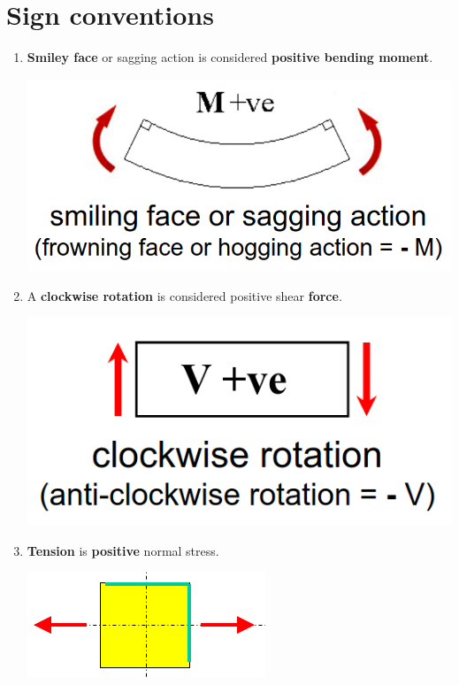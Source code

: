 \documentclass[11pt]{article}
\begin{document}
\newpage
\section{Sign conventions}
\label{sec:orgce59792}
\begin{enumerate}
\item \textbf{Smiley face} or sagging action is considered \textbf{positive bending moment}.
\begin{center}
\includegraphics[scale=0.6]{./images/bending-moment-sign-convention.png}
\end{center}

\item A \textbf{clockwise rotation} is considered positive shear \textbf{force}.
\begin{center}
\includegraphics[scale=0.6]{./images/shear-force-sign-convention.png}
\end{center}

\item \textbf{Tension} is \textbf{positive} normal stress.
\begin{center}
\includegraphics[scale=0.5]{./images/positive-normal-stress.png}
\end{center}


\end{enumerate}
\end{document}
